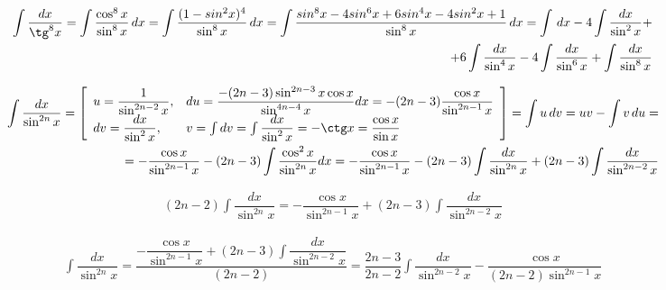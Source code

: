 \begin{eqnarray*}
  \int \dfrac{dx}{\tg^8 x}
  = \int \dfrac{\cos^8 x}{\sin^8 x}\, dx
  = \int \dfrac{(1 - sin^2 x)^4}{\sin^8 x}\, dx
  = \int \dfrac{sin^8 x - 4 sin^6 x + 6 sin^4 x - 4 sin^2 x + 1}{\sin^8 x}\, dx
  = \int\, dx
  - 4 \int \dfrac{dx}{\sin^2 x}
  +\\+ 6 \int \dfrac{dx}{\sin^4 x}
  - 4 \int \dfrac{dx}{\sin^6 x}
  + \int \dfrac{dx}{\sin^8 x}
\end{eqnarray*}

\begin{eqnarray*}
  \int \dfrac{dx}{\sin^{2n} x} =
  \begin{bmatrix}
    \begin{array}{ll}
      u = \dfrac{1}{\sin^{2n-2} x}, & du = \dfrac{- (2n - 3) \sin^{2n-3} x \cos x}{\sin^{4n-4} x} dx = - (2n - 3) \dfrac{\cos x}{\sin^{2n-1} x}\\
      dv = \dfrac{dx}{\sin^{2} x}, & v = \int dv = \int \dfrac{dx}{\sin^{2} x} = -\ctg x = \dfrac{\cos x}{\sin x}
    \end{array}
  \end{bmatrix}
  = \int u\, dv = uv - \int v\, du
  =\\= -\dfrac{\cos x}{\sin^{2n-1} x} 
  - (2n - 3) \int \dfrac {\cos^2 x}{\sin^{2n} x} dx
  = -\dfrac{\cos x}{\sin^{2n-1} x}
  - (2n - 3) \int \dfrac {dx}{\sin^{2n} x}
  + (2n - 3) \int \dfrac {dx}{\sin^{2n - 2} x}
\end{eqnarray*}

\begin{eqnarray*}
  (2n - 2) \int \dfrac{dx}{\sin^{2n} x}
  = -\dfrac{\cos x}{\sin^{2n-1} x}
  + (2n - 3) \int \dfrac {dx}{\sin^{2n - 2} x}
\end{eqnarray*}

\begin{eqnarray*}
  \int \dfrac{dx}{\sin^{2n} x}
  = \dfrac{-\dfrac{\cos x}{\sin^{2n-1} x} + (2n - 3) \int \dfrac {dx}{\sin^{2n - 2} x}}{(2n - 2)}
  = \dfrac{2n - 3}{2n - 2} \int \dfrac {dx}{\sin^{2n - 2} x}
  - \dfrac{\cos x}{(2n - 2) \sin^{2n-1} x}
\end{eqnarray*}

